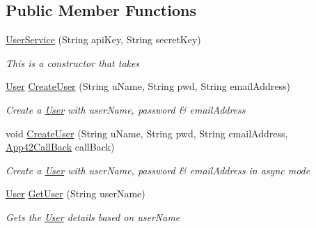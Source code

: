 \subsection*{Public Member Functions}
\begin{DoxyCompactItemize}
\item 
\hyperlink{classcom_1_1shephertz_1_1app42_1_1paas_1_1sdk_1_1csharp_1_1user_1_1_user_service_a90579e46151c2b6e36db7249a3c304bc}{User\+Service} (String api\+Key, String secret\+Key)
\begin{DoxyCompactList}\small\item\em This is a constructor that takes \end{DoxyCompactList}\item 
\hyperlink{classcom_1_1shephertz_1_1app42_1_1paas_1_1sdk_1_1csharp_1_1user_1_1_user}{User} \hyperlink{classcom_1_1shephertz_1_1app42_1_1paas_1_1sdk_1_1csharp_1_1user_1_1_user_service_a7667074be72520880923e12a647ebf0e}{Create\+User} (String u\+Name, String pwd, String email\+Address)
\begin{DoxyCompactList}\small\item\em Create a \hyperlink{classcom_1_1shephertz_1_1app42_1_1paas_1_1sdk_1_1csharp_1_1user_1_1_user}{User} with user\+Name, password \& email\+Address \end{DoxyCompactList}\item 
void \hyperlink{classcom_1_1shephertz_1_1app42_1_1paas_1_1sdk_1_1csharp_1_1user_1_1_user_service_a6b63c4817cf2a03f84ccc07429bc9b6a}{Create\+User} (String u\+Name, String pwd, String email\+Address, \hyperlink{interfacecom_1_1shephertz_1_1app42_1_1paas_1_1sdk_1_1csharp_1_1_app42_call_back}{App42\+Call\+Back} call\+Back)
\begin{DoxyCompactList}\small\item\em Create a \hyperlink{classcom_1_1shephertz_1_1app42_1_1paas_1_1sdk_1_1csharp_1_1user_1_1_user}{User} with user\+Name, password \& email\+Address in async mode \end{DoxyCompactList}\item 
\hyperlink{classcom_1_1shephertz_1_1app42_1_1paas_1_1sdk_1_1csharp_1_1user_1_1_user}{User} \hyperlink{classcom_1_1shephertz_1_1app42_1_1paas_1_1sdk_1_1csharp_1_1user_1_1_user_service_a1fe513b20dcd87393ffb87d5c789c1b3}{Get\+User} (String user\+Name)
\begin{DoxyCompactList}\small\item\em Gets the \hyperlink{classcom_1_1shephertz_1_1app42_1_1paas_1_1sdk_1_1csharp_1_1user_1_1_user}{User} details based on user\+Name \end{DoxyCompactList}\item 

\end{DoxyCompactItemize}
